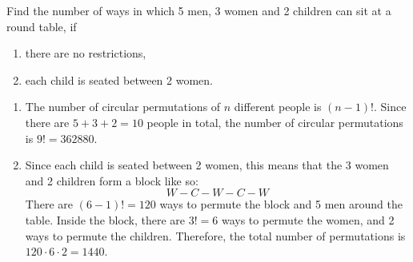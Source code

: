 \begin{question}
    Find the number of ways in which 5 men, 3 women and 2 children can sit at a
    round table, if 
    \begin{enumerate}
        \item there are no restrictions,
        
        \item each child is seated between 2 women.
    \end{enumerate}
\end{question}
\begin{solution}
    \begin{enumerate}
        \item The number of circular permutations of $n$ different people is
            $(n - 1)!$. Since there are $5 + 3 + 2 = 10$ people in total, the
            number of circular permutations is $9! = 362880$.

        \item Since each child is seated between 2 women, this means that the 3
            women and 2 children form a block like so:
            \[ W - C - W - C - W \]
            There are $(6 - 1)! = 120$ ways to permute the block and 5 men around
            the table. Inside the block, there are $3! = 6$ ways to permute the
            women, and 2 ways to permute the children. Therefore, the total number
            of permutations is $120 \cdot 6 \cdot 2 = 1440$. \qedhere
    \end{enumerate}
\end{solution}

